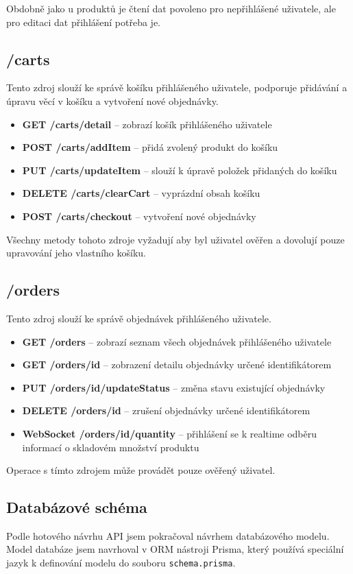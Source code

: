 \documentclass[thesis=M,czech]{FITthesis}[2019/12/23]
\begin{document}
Obdobně jako u produktů je čtení dat povoleno pro nepřihlášené uživatele, ale pro editaci dat přihlášení potřeba je.

\subsection{/carts}
Tento zdroj slouží ke správě košíku přihlášeného uživatele, podporuje přidávání a úpravu věcí v košíku a vytvoření nové objednávky.

\begin{itemize}
  \item \textbf{GET /carts/detail} -- zobrazí košík přihlášeného uživatele
  \item \textbf{POST /carts/addItem} -- přidá zvolený produkt do košíku
  \item \textbf{PUT /carts/updateItem} -- slouží k úpravě položek přidaných do košíku
  \item \textbf{DELETE /carts/clearCart} -- vyprázdní obsah košíku
  \item \textbf{POST /carts/checkout} -- vytvoření nové objednávky
\end{itemize}

Všechny metody tohoto zdroje vyžadují aby byl uživatel ověřen a dovolují pouze upravování jeho vlastního košíku.

\subsection{/orders}
Tento zdroj slouží ke správě objednávek přihlášeného uživatele.

\begin{itemize}
  \item \textbf{GET /orders} -- zobrazí seznam všech objednávek přihlášeného uživatele
  \item \textbf{GET /orders/{id}} -- zobrazení detailu objednávky určené identifikátorem
  \item \textbf{PUT /orders/{id}/updateStatus} -- změna stavu existující objednávky
  \item \textbf{DELETE /orders/{id}} -- zrušení objednávky určené identifikátorem
  \item \textbf{WebSocket /orders/{id}/quantity} -- přihlášení se k realtime odběru informací o skladovém množství produktu
\end{itemize}

Operace s tímto zdrojem může provádět pouze ověřený uživatel.

\subsection*{Databázové schéma}
Podle hotového návrhu API jsem pokračoval návrhem databázového modelu. Model databáze jsem navrhoval v ORM nástroji Prisma, který používá speciální jazyk k definování modelu do souboru \texttt{schema.prisma}.
\end{document}
